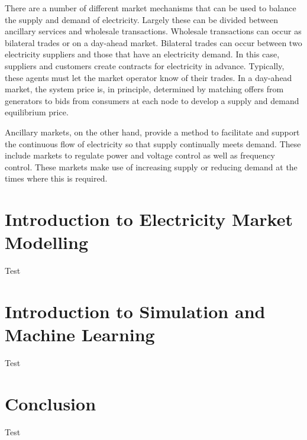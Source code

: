 There are a number of different market mechanisms that can be used to balance the supply and demand of electricity. Largely these can be divided between ancillary services and wholesale transactions. Wholesale transactions can occur as bilateral trades or on a day-ahead market. Bilateral trades can occur between two electricity suppliers and those that have an electricity demand. In this case, suppliers and customers create contracts for electricity in advance. Typically, these agents must let the market operator know of their trades. In a day-ahead market, the system price is, in principle, determined by matching offers from generators to bids from consumers at each node to develop a supply and demand equilibrium price. 

Ancillary markets, on the other hand, provide a method to facilitate and support the continuous flow of electricity so that supply continually meets demand. These include markets to regulate power and voltage control as well as frequency control. These markets make use of increasing supply or reducing demand at the times where this is required. 







\section{Introduction to Electricity Market Modelling}
\label{sec:intro:elecmarketsmodelling}
Test

\section{Introduction to Simulation and Machine Learning}
\label{sec:intro:simulationmodelling}
Test

\section{Conclusion}
\label{sec:intro:conclusion}
Test